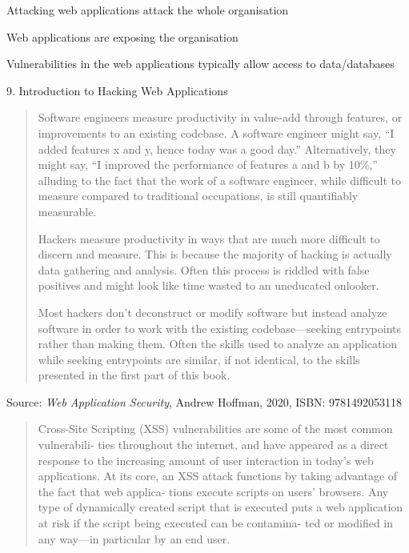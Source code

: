\documentclass[Screen16to9,17pt]{foils}
\begin{document}
\begin{list2}
\item Attacking web applications attack the whole organisation
\item Web applications are exposing the organisation
\item Vulnerabilities in the web applications typically allow access to data/databases
\end{list2}




{\large 9. Introduction to Hacking Web Applications}

\begin{quote}
Software engineers measure productivity in value-add through features, or improvements to an existing codebase. A software engineer might say, “I added features x and y, hence today was a good day.” Alternatively, they might say, “I improved the performance of features a and b by 10\%,” alluding to the fact that the work of a software engineer, while difficult to measure compared to traditional occupations, is still quantifiably measurable.

Hackers measure productivity in ways that are much more difficult to discern and measure. This is because the majority of hacking is actually data gathering and analysis. Often this process is riddled with false positives and might look like time wasted to an uneducated onlooker.

Most hackers don’t deconstruct or modify software but instead analyze software in order to work with the existing codebase—seeking entrypoints rather than making them. Often the skills used to analyze an application while seeking entrypoints are similar, if not identical, to the skills presented in the first part of this book.
\end{quote}
Source: \emph{Web Application Security}, Andrew Hoffman, 2020, ISBN: 9781492053118




\begin{quote}
  Cross-Site Scripting (XSS) vulnerabilities are some of the most common vulnerabili‐
  ties throughout the internet, and have appeared as a direct response to the increasing
  amount of user interaction in today’s web applications.
  At its core, an XSS attack functions by taking advantage of the fact that web applica‐
  tions execute scripts on users’ browsers. Any type of dynamically created script that is
  executed puts a web application at risk if the script being executed can be contamina‐
  ted or modified in any way—in particular by an end user.
\end{quote}
\end{document}
